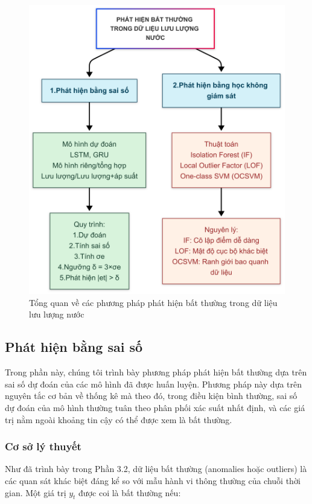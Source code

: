 \begin{figure}[H]
    \centering
    \includegraphics[width=\textwidth]{image/section6_1/luoc_do_phat_hien_bat_thuong.png}
    \caption{Tổng quan về các phương pháp phát hiện bất thường trong dữ liệu lưu lượng nước}
    \label{fig:overview_anomaly_detection}
\end{figure}

\subsection{Phát hiện bằng sai số}
Trong phần này, chúng tôi trình bày phương pháp phát hiện bất thường dựa trên sai số dự đoán của các mô hình đã được huấn luyện. Phương pháp này dựa trên nguyên tắc cơ bản về thống kê mà theo đó, trong điều kiện bình thường, sai số dự đoán của mô hình thường tuân theo phân phối xác suất nhất định, và các giá trị nằm ngoài khoảng tin cậy có thể được xem là bất thường.

\subsubsection{Cơ sở lý thuyết}
Như đã trình bày trong Phần 3.2, dữ liệu bất thường (anomalies hoặc outliers) là các quan sát khác biệt đáng kể so với mẫu hành vi thông thường của chuỗi thời gian. Một giá trị \( y_t \) được coi là bất thường nếu:

